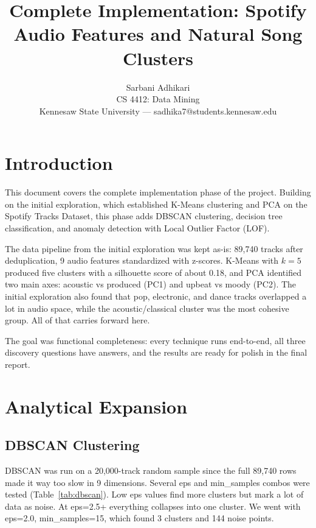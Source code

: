 \documentclass[10pt,twocolumn]{article}
\title{\Large\bfseries Complete Implementation: Spotify Audio Features and Natural Song Clusters}
\author{Sarbani Adhikari\\
\small CS 4412: Data Mining\\
\small Kennesaw State University --- sadhika7@students.kennesaw.edu}
\date{}
\begin{document}
\maketitle

\section{Introduction}

This document covers the complete implementation phase of the project. Building on the initial exploration, which established K-Means clustering and PCA on the Spotify Tracks Dataset, this phase adds DBSCAN clustering, decision tree classification, and anomaly detection with Local Outlier Factor (LOF).

The data pipeline from the initial exploration was kept as-is: 89,740 tracks after deduplication, 9 audio features standardized with z-scores. K-Means with $k=5$ produced five clusters with a silhouette score of about 0.18, and PCA identified two main axes: acoustic vs produced (PC1) and upbeat vs moody (PC2). The initial exploration also found that pop, electronic, and dance tracks overlapped a lot in audio space, while the acoustic/classical cluster was the most cohesive group. All of that carries forward here.

The goal was functional completeness: every technique runs end-to-end, all three discovery questions have answers, and the results are ready for polish in the final report.

\section{Analytical Expansion}

\subsection{DBSCAN Clustering}

DBSCAN was run on a 20,000-track random sample since the full 89,740 rows made it way too slow in 9 dimensions. Several eps and min\_samples combos were tested (Table~\ref{tab:dbscan}). Low eps values find more clusters but mark a lot of data as noise. At eps=2.5+ everything collapses into one cluster. We went with eps=2.0, min\_samples=15, which found 3 clusters and 144 noise points.
\end{document}
